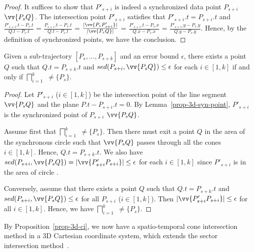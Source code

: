 \begin{proof} It suffices to show that $P'_{s+i}$ is indeed a synchronized data point $P_{s+i}$ \wrt $\vv{P_sQ}$.
%
The intersection point $P'_{s+i}$ satisfies that $P'_{s+i}.t = P_{s+i}.t$ and
$\frac{P'_{s+i}.t - P_{s}.t}{Q.t - P_{s}.t}$ = $\frac{P_{s+i}.t - P_{s}.t}{Q.t - P_{s}.t}$  =
$\frac{|\vv{P_sP'_{s+i}}|}{|\vv{P_sQ}|}$ =
$\frac{P'_{s+i}.t - P_{s}.x}{Q.x - P_{s}.x}$ = $\frac{P'_{s+i}.y - P_{s}.y}{Q.y - P_{s}.y}$.
%
Hence, by the definition of synchronized points, we have the conclusion.
\end{proof}






\begin{prop}
\label{prop-3d-ci}
Given a sub-trajectory $[P_s,...,P_{s+k}]$ and an error bound $\epsilon$, there exists a point $Q$ such that $Q.t = P_{s+k}.t$ and $sed(P_{s+i}, \vv{P_sQ})\le \epsilon$ for each $i \in [1,k]$ if and only if $\bigsqcap_{i=1}^{k}$ $\ne \{P_s\}$.
\end{prop}

\begin{proof}
Let $P'_{s+i}$ ($i\in[1, k]$) be the intersection point of the line segment $\vv{P_sQ}$ and the plane $P.t - P_{s+i}.t=0$.
By Lemma~\ref{prop-3d-syn-point}, $P'_{s+i}$ is the synchronized point of $P_{s+i}$ \wrt $\vv{P_sQ}$.

Assume first that $\bigsqcap_{i=1}^{k}$ $\ne \{P_s\}$. Then there must exit a point $Q $ in the area of the  synchronous circle  such that $\vv{P_sQ}$ passes through all the cones  $i\in[1, k]$. Hence,  $Q.t = P_{s+k}.t$.
We also have $sed(P_{s+i}, \vv{P_sQ}) = |\vv{P'_{s+i}P_{s+i}}| \le \epsilon$ for each $i \in [1, k]$  since $P'_{s+i}$  is in the area of circle  .

Conversely, assume that there exists a point $Q$ such that $Q.t = P_{s+k}.t$ and $sed(P_{s+i}, \vv{P_sQ})\le\epsilon$ for all $P_{s+i}$ ($i \in [1,k]$). Then $|\vv{P'_{s+i}P_{s+i}}| \le \epsilon$ for all $i \in [1, k]$. Hence, we have  $\bigsqcap_{i=1}^{k}$ $\ne \{P_s\}$.
\end{proof}

By Proposition~\ref{prop-3d-ci}, we now have a spatio-temporal cone intersection method in a 3D Cartesian coordinate system, which extends the sector intersection method~\cite{ORourke:Intersection}.


